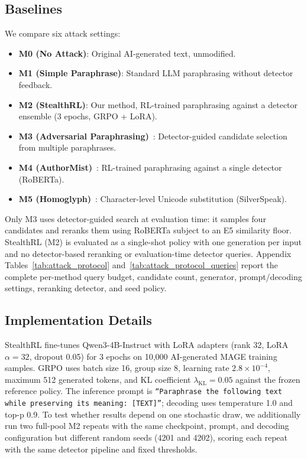 \documentclass[11pt]{article}
\begin{document}
\subsection{Baselines}

We compare six attack settings:
\begin{itemize}[leftmargin=*,itemsep=2pt]
  \item \textbf{M0 (No Attack)}: Original AI-generated text, unmodified.
  \item \textbf{M1 (Simple Paraphrase)}: Standard LLM paraphrasing without detector feedback.
  \item \textbf{M2 (StealthRL)}: Our method, RL-trained paraphrasing against a detector ensemble (3 epochs, GRPO + LoRA).
  \item \textbf{M3 (Adversarial Paraphrasing)}~\cite{cheng2025adversarialparaphrasinguniversalattack}: Detector-guided candidate selection from multiple paraphrases.
  \item \textbf{M4 (AuthorMist)}~\cite{david2025authormistevadingaitext}: RL-trained paraphrasing against a single detector (RoBERTa).
  \item \textbf{M5 (Homoglyph)}~\cite{creo2025silverspeakevadingaigeneratedtext}: Character-level Unicode substitution (SilverSpeak).
\end{itemize}

Only M3 uses detector-guided search at evaluation time: it samples four candidates and reranks them using RoBERTa subject to an E5 similarity floor. StealthRL (M2) is evaluated as a single-shot policy with one generation per input and no detector-based reranking or evaluation-time detector queries. Appendix Tables~\ref{tab:attack_protocol} and~\ref{tab:attack_protocol_queries} report the complete per-method query budget, candidate count, generator, prompt/decoding settings, reranking detector, and seed policy.

\subsection{Implementation Details}
\label{sec:implementation}

StealthRL fine-tunes Qwen3-4B-Instruct with LoRA adapters (rank 32, LoRA $\alpha=32$, dropout 0.05) for 3 epochs on 10,000 AI-generated MAGE training samples. GRPO uses batch size 16, group size 8, learning rate $2.8 \times 10^{-4}$, maximum 512 generated tokens, and KL coefficient $\lambda_{\text{KL}}=0.05$ against the frozen reference policy. The inference prompt is \texttt{``Paraphrase the following text while preserving its meaning: [TEXT]''}; decoding uses temperature 1.0 and top-p 0.9. To test whether results depend on one stochastic draw, we additionally run two full-pool M2 repeats with the same checkpoint, prompt, and decoding configuration but different random seeds (4201 and 4202), scoring each repeat with the same detector pipeline and fixed thresholds.
\end{document}
